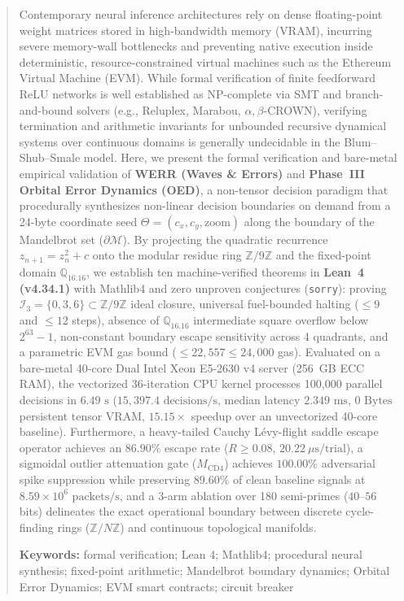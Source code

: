\documentclass[10pt,a4paper]{article}
\begin{document}
\vspace{0.8ex}

\begin{abstract}
\noindent Contemporary neural inference architectures rely on dense floating-point weight matrices stored in high-bandwidth memory (VRAM), incurring severe memory-wall bottlenecks and preventing native execution inside deterministic, resource-constrained virtual machines such as the Ethereum Virtual Machine (EVM). While formal verification of finite feedforward ReLU networks is well established as NP-complete via SMT and branch-and-bound solvers (e.g., Reluplex, Marabou, $\alpha,\beta$-CROWN), verifying termination and arithmetic invariants for unbounded recursive dynamical systems over continuous domains is generally undecidable in the Blum--Shub--Smale model. Here, we present the formal verification and bare-metal empirical validation of \textbf{WERR (Waves \& Errors)} and \textbf{Phase~III Orbital Error Dynamics (OED)}, a non-tensor decision paradigm that procedurally synthesizes non-linear decision boundaries on demand from a 24-byte coordinate seed $\Theta = (c_x, c_y, \text{zoom})$ along the boundary of the Mandelbrot set ($\partial\mathcal{M}$). By projecting the quadratic recurrence $z_{n+1} = z_n^2 + c$ onto the modular residue ring $\mathbb{Z}/9\mathbb{Z}$ and the fixed-point domain $\mathbb{Q}_{16.16}$, we establish ten machine-verified theorems in \textbf{Lean~4 (v4.34.1)} with Mathlib4 and zero unproven conjectures (\texttt{sorry}): proving $\mathcal{I}_3 = \{0,3,6\} \subset \mathbb{Z}/9\mathbb{Z}$ ideal closure, universal fuel-bounded halting ($\le 9$ and $\le 12$ steps), absence of $\mathbb{Q}_{16.16}$ intermediate square overflow below $2^{63}-1$, non-constant boundary escape sensitivity across 4 quadrants, and a parametric EVM gas bound ($\le 22,557 \le 24,000$ gas). Evaluated on a bare-metal 40-core Dual Intel Xeon E5-2630 v4 server (256~GB ECC RAM), the vectorized 36-iteration CPU kernel processes 100,000 parallel decisions in $6.49\text{ s}$ ($15,397.4\text{ decisions/s}$, median latency $2.349\text{ ms}$, $0\text{ Bytes}$ persistent tensor VRAM, $15.15\times$ speedup over an unvectorized 40-core baseline). Furthermore, a heavy-tailed Cauchy L\'{e}vy-flight saddle escape operator achieves an $86.90\%$ escape rate ($R \ge 0.08$, $20.22\ \mu\text{s/trial}$), a sigmoidal outlier attenuation gate ($M_{\text{CD4}}$) achieves $100.00\%$ adversarial spike suppression while preserving $89.60\%$ of clean baseline signals at $8.59 \times 10^6\text{ packets/s}$, and a 3-arm ablation over 180 semi-primes ($40$--$56$ bits) delineates the exact operational boundary between discrete cycle-finding rings ($\mathbb{Z}/N\mathbb{Z}$) and continuous topological manifolds.

\vspace{0.6ex}
\noindent\textbf{Keywords:} formal verification; Lean 4; Mathlib4; procedural neural synthesis; fixed-point arithmetic; Mandelbrot boundary dynamics; Orbital Error Dynamics; EVM smart contracts; circuit breaker
\end{abstract}
\end{document}
